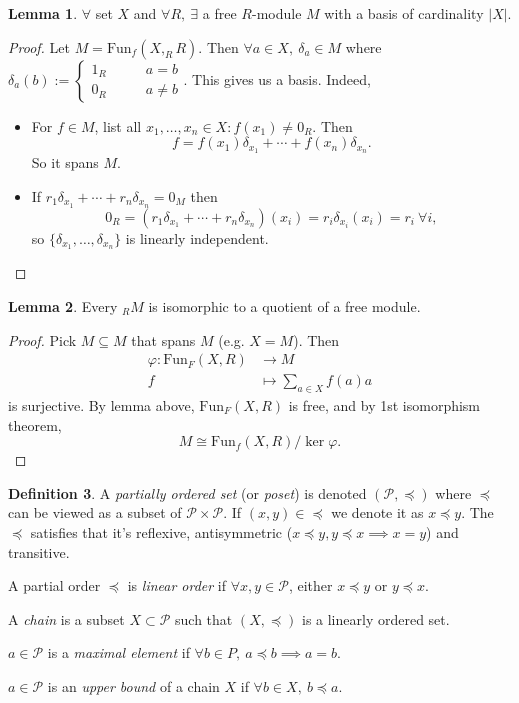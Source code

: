\documentclass[a4paper]{article}
\newcommand{\Fun}{\text{Fun}}
\theoremstyle{definition}
\newtheorem{defn}{Definition}[subsection]
\newtheorem{lemma}[defn]{Lemma}
\begin{document}
\begin{lemma}
$\forall$ set $X$ and $\forall R,\ \exists $ a free $R$-module $M$ with a basis of cardinality $|X|$.
\end{lemma}

\begin{proof}
Let $M=\Fun_f(X,_RR)$. Then $\forall a\in X,\ \delta_a\in M$ where $\delta_a(b):=\left\{\begin{aligned}
  1_R \qquad &a=b \\ 0_R \qquad &a\neq b
\end{aligned} \right. .$ This gives us a basis. Indeed,
\begin{itemize}
\item For $f\in M$, list all $x_1,\ldots,x_n\in X:f(x_1)\neq 0_R$. Then
\[
f=f(x_1)\delta_{x_1}+\cdots+f(x_n)\delta_{x_n}.
\]
So it spans $M$.
\item If $r_1\delta_{x_1}+\cdots+r_n\delta_{x_n}=0_M$ then
\[
0_R=(r_1\delta_{x_1}+\cdots+r_n\delta_{x_n})(x_i)=r_i\delta_{x_i}(x_i)=r_i \ \forall i,
\]
so $\{\delta_{x_1},\ldots,\delta_{x_n}\}$ is linearly independent.
\end{itemize}
\end{proof}

\begin{lemma}
Every $_RM$ is isomorphic to a quotient of a free module.
\end{lemma}
\begin{proof}
Pick $M\subseteq M$ that spans $M$ (e.g. $X=M$). Then
\[
\begin{aligned}
\varphi:\Fun_F(X,R)&\rightarrow M \\
f&\mapsto \sum_{a\in X}f(a)a
\end{aligned}
\]
is surjective. By lemma above, $\Fun_F(X,R)$ is free, and by 1st isomorphism theorem,
\[
M\cong \Fun_f(X,R) / \ker\varphi.
\]
\end{proof}

\begin{defn}
A \textit{partially ordered set} (or \textit{poset}) is denoted $(\mathcal P,\preceq)$ where $\preceq$ can be viewed as a subset of $\mathcal P\times\mathcal P$. If $(x,y)\in\preceq$ we denote it as $x\preceq y$. The $\preceq$ satisfies that it's reflexive, antisymmetric ($x\preceq y,y\preceq x\implies x=y$) and transitive.

A partial order $\preceq$ is \textit{linear order} if $\forall x,y\in\mathcal P$, either $x\preceq y$ or $y\preceq x$.

A \textit{chain} is a subset $X\subset\mathcal P$ such that $(X,\preceq)$ is a linearly ordered set.

$a\in\mathcal P$ is a \textit{maximal element} if $\forall b\in P,\ a\preceq b\implies a=b$.

$a\in\mathcal P$ is an \textit{upper bound} of a chain $X$ if $\forall b\in X,\ b\preceq a$.
\end{defn}
\end{document}
